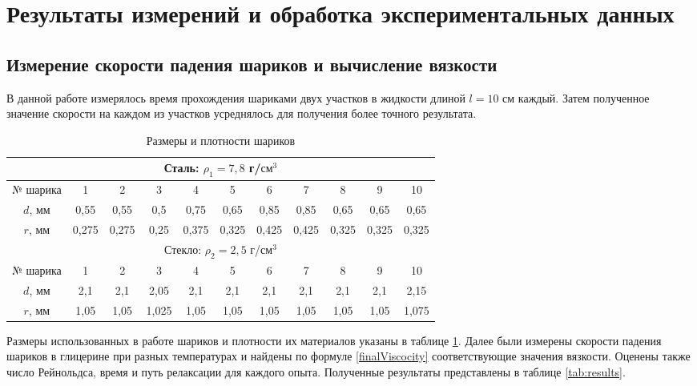 \documentclass[a4paper,12pt]{article} %
\begin{document}
\section{Результаты измерений и обработка экспериментальных данных}

\subsection{Измерение скорости падения шариков и вычисление вязкости}

В данной работе измерялось время прохождения шариками двух участков в жидкости длиной $l = 10$ см каждый. Затем полученное значение скорости на каждом из участков усреднялось для получения более точного результата.

\begin{table}[]
    \centering
    \begin{tabular}{|c|c|c|c|c|c|c|c|c|c|c|} \hline
        \multicolumn{11}{|c|}{Сталь: $\rho_1 = 7,8$ г/$\text{см}^3$}\\ \hline
        № шарика & 1 & 2 & 3 & 4 & 5 & 6 & 7 & 8 & 9 & 10 \\ \hline
        $d$, мм & 0,55 & 0,55 & 0,5 & 0,75 & 0,65 & 0,85 & 0,85 & 0,65 & 0,65 & 0,65 \\ \hline
        $ r $, мм & 0,275 & 0,275 & 0,25 & 0,375 & 0,325 & 0,425 & 0,425 & 0,325 & 0,325 & 0,325 \\ \hline
        \multicolumn{11}{|c|}{Стекло: $\rho_2 = 2,5$ г/$\text{см}^3$}\\ \hline
        № шарика & 1 & 2 & 3 & 4 & 5 & 6 & 7 & 8 & 9 & 10 \\ \hline
        $d$, мм & 2,1 & 2,1 & 2,05 & 2,1 & 2,1 & 2,1 & 2,1 & 2,1 & 2,1 & 2,15 \\ \hline
        $ r $, мм & 1,05 & 1,05 & 1,025 & 1,05 & 1,05 & 1,05 & 1,05 & 1,05 & 1,05 & 1,075 \\ \hline
    \end{tabular}
    \caption{Размеры и плотности шариков}
    \label{tab:dimensions}
\end{table}

Размеры использованных в работе шариков и плотности их материалов указаны в таблице \ref{tab:dimensions}. Далее были измерены скорости падения шариков в глицерине при разных температурах и найдены по формуле \eqref{finalViscocity} соответствующие значения вязкости. Оценены также число Рейнольдса, время и путь релаксации для каждого опыта. Полученные результаты представлены в таблице \ref{tab:results}. 
\end{document}

